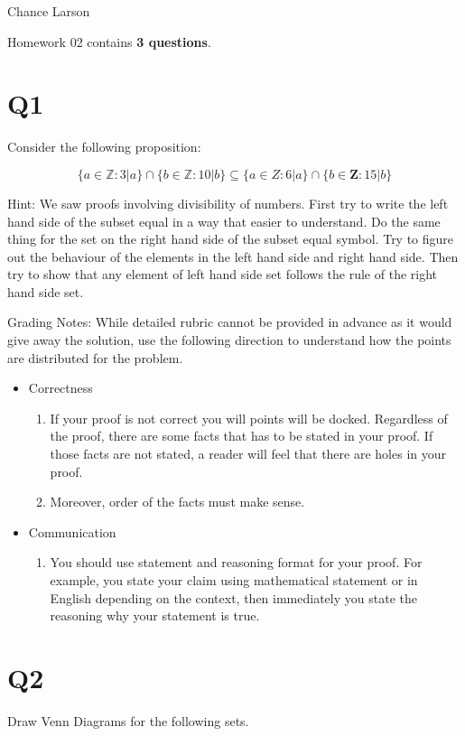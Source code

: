 Chance Larson\documentclass[12pt]{exam}
\begin{document}
Homework 02 contains \textbf{3 questions}.

\section{Q1}
Consider the following proposition: 

\[ \{a \in \mathds{Z}: 3 | a \} \cap \{ b \in \mathds{Z} : 10 | b\} \subseteq \{ a \in Z: 6| a\} \cap \{ b \in \mathbf{Z} : 15|b\}\]

Hint: We saw proofs involving divisibility of numbers. First try to write the left hand side of the subset equal in a way that easier to understand. Do the same thing for the set on the right hand side of the subset equal symbol. Try to figure out the behaviour of the elements in the left hand side and right hand side. Then try to show that any element of left hand side set follows the rule of the right hand side set. 

Grading Notes:
While detailed rubric cannot be provided in advance as it would give away the solution, use the following direction to understand how the points are distributed for the problem.
\begin{itemize}
    \item Correctness
    \begin{enumerate}
        \item If your proof is not correct you will points will be docked. Regardless of the proof, there are some facts that has to be stated in your proof. If those facts are not stated, a reader will feel that there are holes in your proof. 
        \item Moreover, order of the facts must make sense. 
    \end{enumerate}
        
    \item Communication 
        \begin{enumerate}
            \item You should use statement and reasoning format for your proof. For example, you state your claim using mathematical statement or in English depending on the context, then immediately you state the reasoning why your statement is true.
        \end{enumerate}
\end{itemize}


\section{Q2}
Draw Venn Diagrams for the following sets. 
\end{document}
